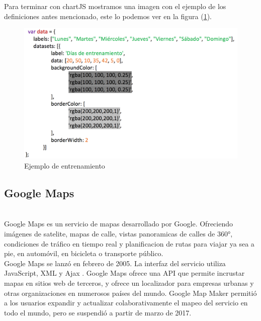 \documentclass[a4paper, 11pt]{article}
\begin{document}
\begin{itemize}
          Para terminar con chartJS mostramos una imagen con el ejemplo de los
          definiciones antes mencionado, este lo podemos ver en la figura
          (\ref{f:ejemplo-entrenamiento}).\\

          \begin{figure}[H]
              \centering
              \includegraphics[width=\textwidth]{ejemplo-entrenamiento}
              \caption{Ejemplo de entrenamiento}
              \label{f:ejemplo-entrenamiento}
          \end{figure}

        \subsection{Google Maps}\\

          Google Maps es un servicio de mapas desarrollado por Google. Ofreciendo
          imágenes de satelite, mapas de calle, vistas panoramicas de calles de
          360​​°, condiciones de tráfico en tiempo real y planificacion de rutas
          para viajar ya sea a pie, en automóvil, en bicicleta o transporte
          público.\\

          Google Maps se lanzó en febrero de 2005. La interfaz del servicio
          utiliza JavaScript, XML y Ajax . Google Maps ofrece una API que permite
          incrustar mapas en sitios web de terceros, y ofrece un localizador para
          empresas urbanas y otras organizaciones en numerosos países del mundo.
          Google Map Maker permitió a los usuarios expandir y actualizar
          colaborativamente el mapeo del servicio en todo el mundo, pero se
          suspendió a partir de marzo de 2017.\\


\end{itemize}
\end{document}
